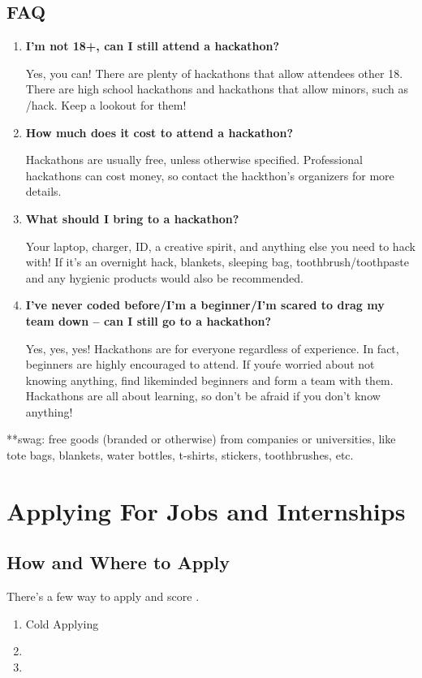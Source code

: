 \documentclass{article}
\begin{document}
\subsection{FAQ}
\begin{enumerate}
\item \textbf{I'm not 18+, can I still attend a hackathon?}
    \begin{itemize}
    Yes, you can! There are plenty of hackathons that allow attendees other 18. There are high school hackathons and hackathons that allow minors, such as /hack. Keep a lookout for them!
    \end{itemize}
\item \textbf{How much does it cost to attend a hackathon?}
    \begin{itemize}
        Hackathons are usually free, unless otherwise specified. Professional hackathons can cost money, so contact the hackthon's organizers for more details. 
    \end{itemize}
\item \textbf{What should I bring to a hackathon?}
    \begin{itemize}
       Your laptop, charger, ID, a creative spirit, and anything else you need to hack with! If it's an overnight hack, blankets, sleeping bag, toothbrush/toothpaste and any hygienic products would also be recommended.
    \end{itemize}
\item \textbf{I've never coded before/I'm a beginner/I'm scared to drag my team down -- can I still go to a hackathon?}
    \begin{itemize}
        Yes, yes, yes! Hackathons are for everyone regardless of experience. In fact, beginners are highly encouraged to attend. If you\'re worried about not knowing anything, find likeminded beginners and form a team with them. Hackathons are all about learning, so don't be afraid if you don't know anything!
    \end{itemize}
\end{enumerate}

**swag: free goods (branded or otherwise) from companies or universities, like tote bags, blankets, water bottles, t-shirts, stickers, toothbrushes, etc. 
\newpage

\section {Applying For Jobs and Internships}
\subsection{How and Where to Apply}
\hspace{0.5cm}There's a few way to apply and score . 
\begin{enumerate}
    \item Cold Applying
    \item {}
    \item {}
\end{enumerate}
\end{document}
